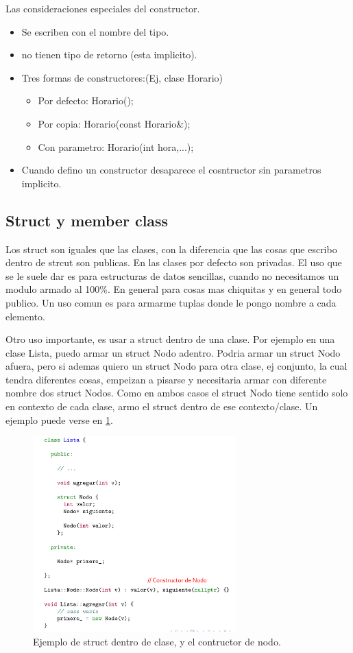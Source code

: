 \documentclass[11pt]{article}
\begin{document}
Las consideraciones especiales del constructor.
\begin{itemize}
    \item Se escriben con el nombre del tipo.
    \item no tienen tipo de retorno (esta implicito).
    \item Tres formas de constructores:(Ej, clase Horario)
        \begin{itemize}
            \item Por defecto: Horario();
            \item Por copia: Horario(const Horario\&);
            \item Con parametro: Horario(int hora,...);
        \end{itemize}
    \item Cuando defino un constructor desaparece el cosntructor sin parametros
            implicito.
\end{itemize}

\subsection{Struct y member class}
Los struct son iguales que las clases, con la diferencia que las cosas que escribo
dentro de strcut son publicas.
En las clases por defecto son privadas.
El uso que se le suele dar es para estructuras de datos sencillas, cuando no
necesitamos un modulo armado al 100\%.
En general para cosas mas chiquitas y en general todo publico.
Un uso comun es para armarme tuplas donde le pongo nombre a cada elemento.

Otro uso importante, es usar a struct dentro de una clase.
Por ejemplo en una clase Lista, puedo armar un struct Nodo adentro.
Podria armar un struct Nodo afuera, pero si ademas quiero un struct Nodo
para otra clase, ej conjunto, la cual tendra diferentes cosas, empeizan a pisarse
y necesitaria armar con diferente nombre dos struct Nodos.
Como en ambos casos el struct Nodo tiene sentido solo en contexto de cada clase,
armo el struct dentro de ese contexto/clase.
Un ejemplo puede verse en \ref{fig:nodo}.

\begin{figure}[h!]
    \centering
    \includegraphics[width=0.7\textwidth]{nodo.png}
    \caption{Ejemplo de struct dentro de clase, y el contructor de nodo.}
    \label{fig:nodo}
\end{figure}
\end{document}
